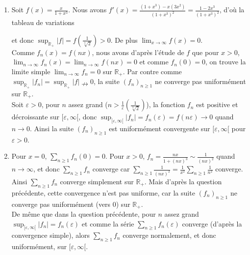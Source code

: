 \documentclass[a4paper,11pt,reqno]{amsart}
\begin{document}
\begin{solution}
  \begin{enumerate}
    \item Soit $f(x)=\frac{x}{1+x^3}$. Nous avons $f'(x)=\frac{(1+x^3)-x(3x^2)}{(1+x^3)^2} = \frac{1-2x^3}{(1+x^3)^2}$, d'où la tableau de variations
    \begin{center}
    \end{center}
    et donc $\sup_{\mathbb{R}_{+}}|f|=f(\frac{1}{\sqrt[3]{2}}) > 0$. De plus $\lim_{x\to\infty}f(x)=0$.\\
    Comme $f_{n}(x)=f(nx)$, nous avons d'après l'étude de $f$ que pour $x>0$, $\lim_{n\to\infty}f_n(x)=\lim_{n\to\infty}f(nx)=0$ et comme $f_{n}(0)=0$, on trouve la limite simple $\lim_{n\to\infty}f_n=0$ sur $\mathbb{R}_{+}$. Par contre comme $\sup_{\mathbb{R}_{+}}|f_n|=\sup_{\mathbb{R}_{+}}|f|\nrightarrow 0$, la suite $(f_{n})_{n\geq 1}$ ne converge pas uniformément sur $\mathbb{R}_{+}$.\\
    Soit $\varepsilon>0$, pour $n$ assez grand ($n>\frac{1}{\varepsilon}(\frac{1}{\sqrt[3]{2}})$), la fonction $f_{n}$ est positive et décroissante sur $[\varepsilon,\infty[$, donc $\sup_{[\varepsilon,\infty[}|f_n|=f_{n}(\varepsilon) = f(n\varepsilon) \to 0$ quand $n\to 0$. Ainsi la suite $(f_{n})_{n\geq 1}$ est uniformément convergente sur $[\varepsilon,\infty[$ pour $\varepsilon>0$.

    \item Pour $x=0$, $\sum_{n\geq 1}f_{n}(0)=0$. Pour $x>0$, $f_{n}=\frac{nx}{1+(nx)^3}\sim\frac{1}{(nx)^2}$ quand $n\to\infty$, et donc $\sum_{n\geq 1}f_{n}$ converge car $\sum_{n\geq 1}\frac{1}{(nx)^2} = \frac{1}{x^2}\sum_{n\geq 1}\frac{1}{n^2}$ converge. Ainsi $\sum_{n\geq 1}f_{n}$ converge simplement sur $\mathbb{R}_{+}$. Mais d'après la question précédente, cette convergence n'est pas uniforme, car la suite $(f_{n})_{n\geq 1}$ ne converge pas uniformément (vers $0$) sur $\mathbb{R}_{+}$.\\
    De même que dans la question précédente, pour $n$ assez grand $\sup_{[\varepsilon,\infty[}|f_n|=f_{n}(\varepsilon)$ et comme la série $\sum_{n\geq 1}f_{n}(\varepsilon)$ converge (d'après la convergence simple), alors $\sum_{n\geq 1}f_{n}$ converge normalement, et donc uniformément, sur $[\varepsilon,\infty[$.
  \end{enumerate}
\end{solution}
\end{document}
